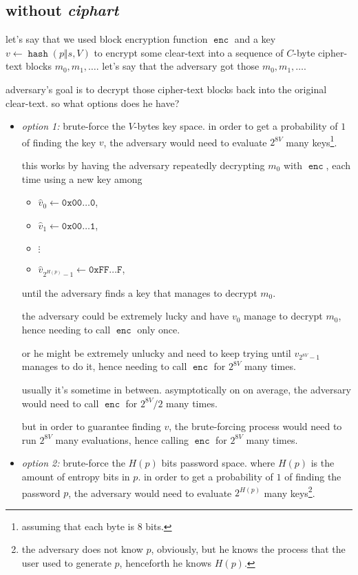 \documentclass[twocolumn]{article}
\DeclareMathOperator{\enc}{\texttt{enc}}
\DeclareMathOperator{\hash}{\texttt{hash}}
\begin{document}
\subsection{without \emph{ciphart}}
let's say that we used block encryption function $\enc$ and a key $v \gets
\hash(p \Vert s, V)$ to encrypt some clear-text into a sequence of
$C$-byte cipher-text blocks $m_0, m_1, \ldots$.  let's say that the
adversary got those $m_0, m_1, \ldots$.

adversary's goal is to decrypt those cipher-text blocks back into the
original clear-text.  so what options does he have?
\begin{itemize}
    \item \emph{option 1:} brute-force the $V$-bytes key space.  in order
    to get a probability of $1$ of finding the key $v$, the adversary would
    need to evaluate $2^{8V}$ many keys\footnote{assuming that each
    byte is $8$ bits.}.

    this works by having the adversary repeatedly decrypting $m_0$ with
    $\enc$, each time using a new key among
    \begin{itemize}
        \item $\hat v_0 \gets \texttt{0x00\ldots 0}$,
        \item $\hat v_1 \gets \texttt{0x00\ldots 1}$,
        \item $\vdots$
        \item $\hat v_{2^{H(p)}-1} \gets \texttt{0xFF\ldots F}$,
    \end{itemize}
    until the adversary finds a key that manages to decrypt $m_0$.

    the adversary could be extremely lucky and have $v_0$ manage to decrypt
    $m_0$, hence needing to call $\enc$ only once.  

    or he might be extremely unlucky and need to keep trying until
    $v_{2^{8V}-1}$ manages to do it, hence needing to call $\enc$ for
    $2^{8V}$ many times.

    usually it's sometime in between.  asymptotically on on average, the
    adversary would need to call $\enc$ for $2^{8V}/2$ many times.

    but in order to guarantee finding $v$, the brute-forcing process would
    need to run $2^{8V}$ many evaluations, hence calling $\enc$ for
    $2^{8V}$ many times.

    \item \emph{option 2:} brute-force the $H(p)$ bits password space.
    where $H(p)$ is the amount of entropy bits in $p$.  in order to get a
    probability of $1$ of finding the password $p$, the adversary would
    need to evaluate $2^{H(p)}$ many keys\footnote{the adversary does not
    know $p$, obviously, but he knows the process that the user used to
    generate $p$, henceforth he knows $H(p)$.}.


\end{itemize}
\end{document}
